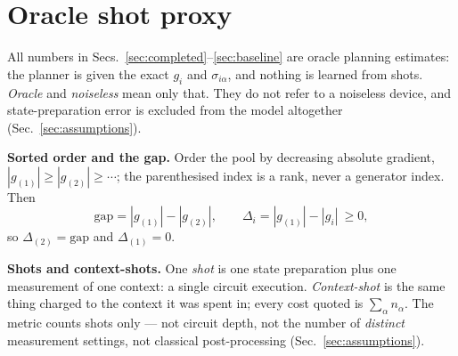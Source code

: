 \documentclass[10pt]{article}
\begin{document}
\section{Oracle shot proxy}
\label{sec:proxy}

All numbers in Secs.~\ref{sec:completed}--\ref{sec:baseline} are oracle planning estimates: the planner is given the exact $g_i$ and $\sigma_{i\alpha}$, and nothing is learned from shots. \emph{Oracle} and \emph{noiseless} mean only that. They do not refer to a noiseless device, and state-preparation error is excluded from the model altogether (Sec.~\ref{sec:assumptions}).

\textbf{Sorted order and the gap.} Order the pool by decreasing absolute gradient, $|g_{(1)}|\ge|g_{(2)}|\ge\cdots$; the parenthesised index is a rank, never a generator index. Then
\begin{equation}
  \mathrm{gap}=|g_{(1)}|-|g_{(2)}|,
  \qquad
  \Delta_i=|g_{(1)}|-|g_i| \ \ge 0 ,
  \label{eq:gap}
\end{equation}
so $\Delta_{(2)}=\mathrm{gap}$ and $\Delta_{(1)}=0$.

\textbf{Shots and context-shots.} One \emph{shot} is one state preparation plus one measurement of one context: a single circuit execution. \emph{Context-shot} is the same thing charged to the context it was spent in; every cost quoted is $\sum_\alpha n_\alpha$. The metric counts shots only --- not circuit depth, not the number of \emph{distinct} measurement settings, not classical post-processing (Sec.~\ref{sec:assumptions}).
\end{document}
